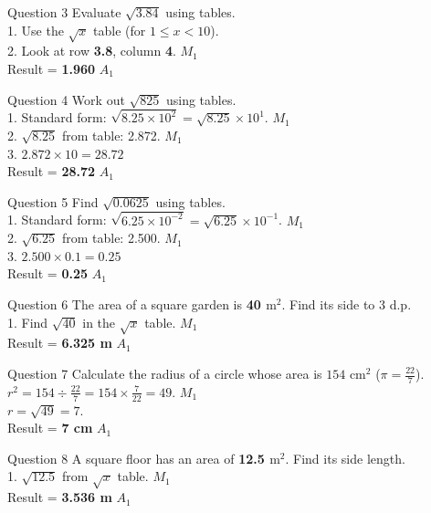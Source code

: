 \documentclass[12pt, a4paper, oneside]{article}
\begin{document}
\begin{solvingbox}{Question 3}
Evaluate $\sqrt{3.84}$ using tables. \\
1. Use the $\sqrt{x}$ table (for $1 \leq x < 10$). \\
2. Look at row \textbf{3.8}, column \textbf{4}. \hfill $M_1$ \\
Result = \textbf{1.960} \hfill $A_1$
\end{solvingbox}

\begin{solvingbox}{Question 4}
Work out $\sqrt{825}$ using tables. \\
1. Standard form: $\sqrt{8.25 \times 10^2} = \sqrt{8.25} \times 10^1$. \hfill $M_1$ \\
2. $\sqrt{8.25}$ from table: 2.872. \hfill $M_1$ \\
3. $2.872 \times 10 = 28.72$ \\
Result = \textbf{28.72} \hfill $A_1$
\end{solvingbox}

\begin{solvingbox}{Question 5}
Find $\sqrt{0.0625}$ using tables. \\
1. Standard form: $\sqrt{6.25 \times 10^{-2}} = \sqrt{6.25} \times 10^{-1}$. \hfill $M_1$ \\
2. $\sqrt{6.25}$ from table: 2.500. \hfill $M_1$ \\
3. $2.500 \times 0.1 = 0.25$ \\
Result = \textbf{0.25} \hfill $A_1$
\end{solvingbox}

\begin{solvingbox}{Question 6}
The area of a square garden is \textbf{40 $\text{m}^2$}. Find its side to 3 d.p. \\
1. Find $\sqrt{40}$ in the $\sqrt{x}$ table. \hfill $M_1$ \\
Result = \textbf{6.325 m} \hfill $A_1$
\end{solvingbox}

\begin{solvingbox}{Question 7}
Calculate the radius of a circle whose area is $154 \text{ cm}^2$ ($\pi = \frac{22}{7}$). \\
$r^2 = 154 \div \frac{22}{7} = 154 \times \frac{7}{22} = 49$. \hfill $M_1$ \\
$r = \sqrt{49} = 7$. \\
Result = \textbf{7 cm} \hfill $A_1$
\end{solvingbox}

\begin{solvingbox}{Question 8}
A square floor has an area of \textbf{12.5 $\text{m}^2$}. Find its side length. \\
1. $\sqrt{12.5}$ from $\sqrt{x}$ table. \hfill $M_1$ \\
Result = \textbf{3.536 m} \hfill $A_1$
\end{solvingbox}
\end{document}
